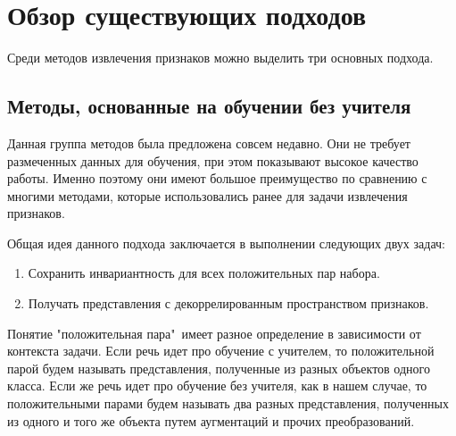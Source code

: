 \section{Обзор существующих подходов}
\label{sec:Chapter1} 



Среди методов извлечения признаков можно выделить три основных подхода.

\subsection{Методы, основанные на обучении без учителя}
\label{sec:methods}

Данная группа методов была предложена совсем недавно. Они не требует размеченных данных для обучения, при этом показывают высокое качество работы. Именно поэтому они имеют большое преимущество по сравнению с многими методами, которые использовались ранее для задачи извлечения признаков. 

Общая идея данного подхода заключается в выполнении следующих двух задач:
\begin{enumerate} 
    \item Сохранить инвариантность для всех положительных пар набора.
    \item Получать представления с декоррелированным пространством признаков.
\end{enumerate}

Понятие "положительная пара"\ имеет разное определение в зависимости от контекста задачи. Если речь идет про обучение с учителем, то положительной парой будем называть представления, полученные из разных объектов одного класса. Если же речь идет про обучение без учителя, как в нашем случае, то положительными парами будем называть два разных представления, полученных из одного и того же объекта путем аугментаций и прочих преобразований.  

